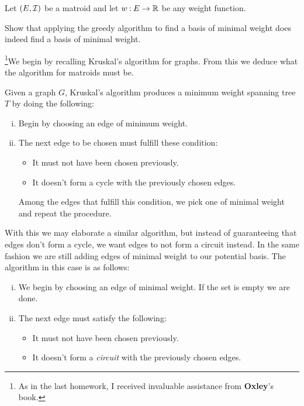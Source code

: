 \documentclass[12pt]{memoir}
\begin{document}
\begin{Ej}[Exercise 7]
    Let $(E, \mathcal{I})$ be a matroid and let $w\mathbin{:} E\to\mathbb{R}$ be any weight function.\par
    Show that applying the greedy algorithm to find a basis of minimal weight does indeed find a basis of minimal weight.
\end{Ej}

\begin{ptcbr}
    \footnote{As in the last homework, I received invaluable assistance from \textbf{Oxley}'s book.}We begin by recalling Kruskal's algorithm for graphs. From this we deduce what the algorithm for matroids must be.\par 
    Given a graph $G$, Kruskal's algorithm produces a minimum weight spanning tree $T$ by doing the following:
    \begin{enumerate}[i)]
        \itemsep=-0.4em
        \item Begin by choosing an edge of minimum weight.
        \item The next edge to be chosen must fulfill these condition:
        \begin{itemize}
            \itemsep=-0.4em 
            \item It must not have been chosen previously.
            \item It doesn't form a cycle with the previously chosen edges.
        \end{itemize}
        Among the edges that fulfill this condition, we pick one of minimal weight and repeat the procedure.
    \end{enumerate}
    With this we may elaborate a similar algorithm, but instead of guaranteeing that edges don't form a cycle, we want edges to not form a circuit instead. In the same fashion we are still adding edges of minimal weight to our potential basis. The algorithm in this case is as follows:
    \begin{enumerate}[i)]
        \itemsep=-0.4em
        \item We begin by choosing an edge of minimal weight. If the set is empty we are done.
        \item The next edge must satisfy the following:
        \begin{itemize}
            \itemsep=-0.4em 
            \item It must not have been chosen previously.
            \item It doesn't form a \emph{circuit} with the previously chosen edges.
        \end{itemize}

\end{enumerate}
\end{ptcbr}
\end{document}
